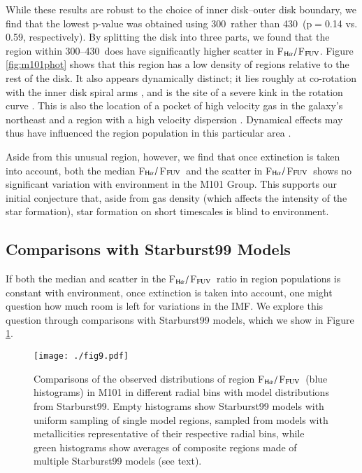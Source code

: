 \documentclass[iop]{emulateapj}
\newcommand{\hafuv}{F$_{\rm H\alpha}/$F$_{\rm FUV}$}
\begin{document}
While these results are robust to the choice of inner
disk--outer disk boundary, we find that the lowest p-value was obtained
using 300\arcsec \ rather than 430\arcsec \ (p$=$0.14 vs. 0.59,
respectively).  By splitting the disk into three parts, we found that
the region within 300\arcsec--430\arcsec \ does have significantly
higher scatter in \hafuv.  Figure \ref{fig:m101phot} shows that this
region has a low density of  regions relative to the rest of
the disk.  It also appears dynamically distinct; it lies roughly at
co-rotation with the inner disk spiral arms \citep{waller97}, and is
the site of a severe kink in the  rotation curve
\citep{meidt09}.  This is also the location of a pocket of high
velocity gas in the galaxy's northeast \citep{walter08, mihos12} and a
region with a high velocity dispersion \citep{walter08}.  Dynamical
effects may thus have influenced the  region population in
this particular area \citep[a high gas velocity dispersion, for
  example, may inhibit star formation;][]{kennicutt89}.

Aside from this unusual region, however, we find that once extinction
is taken into account, both the median \hafuv \ and the scatter in
\hafuv \ shows no significant variation with environment in the M101
Group.  This supports our initial conjecture that, aside from gas
density (which affects the intensity of the star formation), star
formation on short timescales is blind to environment.

\subsection{Comparisons with Starburst99 Models}

If both the median and scatter in the \hafuv \ ratio in 
region populations is constant with environment, once extinction is
taken into account, one might question how much room is left for
variations in the IMF.  We explore this question through comparisons
with Starburst99 \citep{leitherer99} models, which we show in Figure
\ref{fig:sbhists}.

\begin{figure*}
  \centering
  \texttt{[image: ./fig9.pdf]}
  \caption[Observed and model distributions of \hafuv \ in
    M101]{Comparisons of the observed distributions of 
    region \hafuv \ (blue histograms) in M101 in different radial bins
    with model distributions from Starburst99.  Empty histograms show
    Starburst99 models with uniform sampling of single model regions,
    sampled from models with metallicities representative of their
    respective radial bins, while green histograms show averages of
    composite regions made of multiple Starburst99 models (see
      text).  \label{fig:sbhists}}
\end{figure*}
\end{document}
